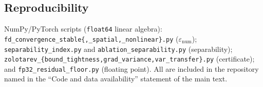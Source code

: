 \documentclass[review,12pt]{elsarticle}
\begin{document}
\subsection{Reproducibility}
NumPy/PyTorch scripts (\texttt{float64} linear algebra):
\texttt{fd\_convergence\_stable\{,\_spatial,\_nonlinear\}.py}
($\varepsilon_{\mathrm{num}}$); \texttt{separability\_index.py} and
\texttt{ablation\_separability.py} (separability);
\texttt{zolotarev\_\{bound\_tightness,grad\_variance,var\_transfer\}.py}
(certificate); and \texttt{fp32\_residual\_floor.py} (floating point).
All are included in the repository named in the ``Code and data
availability'' statement of the main text.



\end{document}
